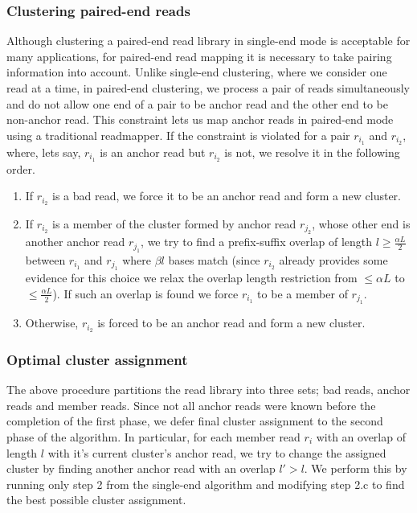 \documentclass[a4paper]{article}
\begin{document}
\subsubsection{Clustering paired-end reads}
Although clustering a paired-end read library in single-end mode is
acceptable for many applications, for paired-end read mapping
it is necessary to take pairing information
into account.
Unlike single-end clustering, where we consider one read at a time,
in paired-end clustering, we process a pair of reads simultaneously
and do not allow one end of a pair to be anchor read and the other
end to be non-anchor read.
This constraint lets us map anchor reads in paired-end
mode using a traditional readmapper.
If the constraint is violated for a pair $r_{i_1}$ and $r_{i_2}$,
where, lets say, $r_{i_1}$ is an anchor read but $r_{i_2}$ is not,
we resolve it in the following order.
\begin{enumerate}

\item If $r_{i_2}$ is a bad read, we force it to be an anchor read and
form a new cluster.
\item If $r_{i_2}$ is a member of the cluster formed by anchor read
$r_{j_2}$, whose other end is another anchor read $r_{j_1}$,
we try to find a prefix-suffix overlap of length
$l \ge \frac{\alpha L}{2}$ between $r_{i_1}$ and $r_{j_1}$ where
$\beta l$ bases match (since $r_{i_2}$ already provides some evidence
for this choice we relax the overlap length restriction from
$\le \alpha L$ to $\le \frac{\alpha L}{2}$).
If such an overlap is found we force
$r_{i_1}$ to be a member of $r_{j_1}$.
\item Otherwise, $r_{i_2}$ is forced to be an anchor read and form a
new cluster.
\end{enumerate}


\subsubsection{Optimal cluster assignment}
The above procedure partitions the read library into three sets; bad reads, anchor
reads and member reads.
Since not all anchor reads were known before the completion of the first phase,
we defer final cluster assignment to the second phase of the algorithm.
In particular, for each member read $r_i$ with an overlap of length $l$
with it's current cluster's anchor read, we try to change the
assigned cluster by finding another anchor read with an overlap $l' > l$.
We perform this by running only step 2 from the single-end algorithm
and modifying step 2.c to find the best possible cluster assignment.
\end{document}
